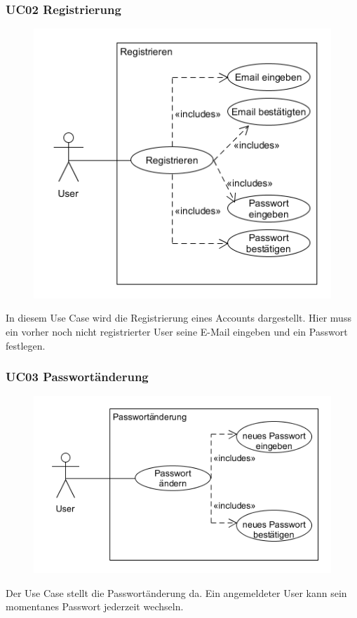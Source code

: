 		\subsubsection{UC02 Registrierung}
			\begin{figure}[H]
				\includegraphics[scale=0.8]{images/Registrierung}
			\end{figure}
			In diesem Use Case wird die Registrierung eines Accounts dargestellt. Hier muss ein vorher noch nicht registrierter User seine E-Mail eingeben und ein Passwort festlegen.  
		
		\subsubsection{UC03 Passwortänderung}
			\begin{figure}[H]
				\includegraphics[scale=0.8]{images/Passwortanderung}
			\end{figure}
			Der Use Case stellt die Passwortänderung da. Ein angemeldeter User kann sein momentanes Passwort jederzeit wechseln. 
\newpage		 
